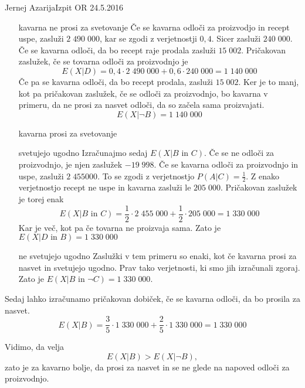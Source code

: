 \begin{naloga}{Jernej Azarija}{Izpit OR 24.5.2016}
\begin{odgovor}
\begin{itemize}
\item[kavarna ne prosi za svetovanje]
Če se kavarna odloči za proizvodjo in recept uspe, zasluži $2\; 490 \; 000$, kar se zgodi z verjetnostji $0,4$. Sicer zasluži $240 \; 000$. Če se kavarna odloči, da bo recept raje prodala zasluži $15 \; 002$. Pričakovan zaslužek, če se tovarna odloči za proizvodnjo je
$$
E(X|D) = 0,4 \cdot 2 \;490 \;000 + 0,6 \cdot 240 \; 000 = 1\;140\;000
$$
Če pa se kavarna odloči, da bo recept prodala, zasluži $15 \; 002$. Ker je to manj, kot pa pričakovan zaslužek, če se odloči za proizvodnjo, bo kavarna v primeru, da ne prosi za nasvet odloči, da so začela sama proizvajati.
$$
E(X|\neg B) = 1\;140\;000
$$

\item[kavarna prosi za svetovanje]
\item[svetujejo ugodno]
Izračunajmo sedaj $E(X|B \text{ in } C)$. Če se ne odloči za proizvodnjo, je njen zaslužek $-19\;998$. Če se kavarna odloči za proizvodnjo in uspe, zasluži $2\;455000$. To se zgodi z verjetnostjo $P(A|C) = \frac{1}{2}$. Z enako verjetnostjo recept ne uspe in kavarna zasluži le $205\;000$. Pričakovan zaslužek je torej enak 
$$
E(X|B \text{ in } C) = \frac{1}{2} \cdot 2\;455\;000 + \frac{1}{2} \cdot 205\;000 = 1\;330\;000
$$
Kar je več, kot pa če tovarna ne proizvaja sama. Zato je $E(X|D \text{ in } B)= 1\;330\;000$

\item[ne svetujejo ugodno]
Zaslužki v tem primeru so enaki, kot če kavarna prosi za nasvet in svetujejo ugodno. Prav tako verjetnosti, ki smo jih izračunali zgoraj. Zato je $E(X|B \text{ in } \neg C) = 1\;330\;000$.

\end{itemize}
Sedaj lahko izračunamo pričakovan dobiček, če se kavarna odloči, da bo prosila za nasvet.
$$
E(X|B) = \frac{3}{5}\cdot  1\;330\;000 + \frac{2}{5} \cdot 1\;330\;000 = 1\;330\;000
$$

Vidimo, da velja
$$
 E(X|B) > E(X|\neg B) ,
$$
zato je za kavarno bolje, da prosi za nasvet in se ne glede na napoved odloči za proizvodnjo.
\end{odgovor}
\end{naloga}
